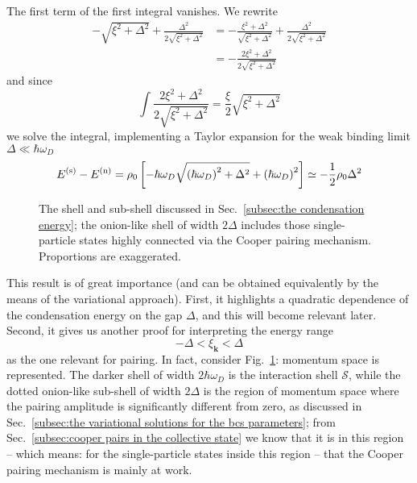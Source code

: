 The first term of the first integral vanishes. We rewrite
\[
\begin{aligned}
	- \sqrt{\xi^2 + \Delta^2} + \frac{\Delta^2}{2\sqrt{\xi^2 + \Delta^2}} &= - \frac{\xi^2 + \Delta^2}{\sqrt{\xi^2 + \Delta^2}} + \frac{\Delta^2}{2\sqrt{\xi^2 + \Delta^2}}\\
	&= - \frac{2\xi^2 + \Delta^2}{2\sqrt{\xi^2 + \Delta^2}}
\end{aligned}
\]
and since
\[
	\int \frac{2\xi^2 + \Delta^2}{2\sqrt{\xi^2 + \Delta^2}} = \frac{\xi}{2} \sqrt{\xi^2 + \Delta^2}
\]
we solve the integral, implementing a Taylor expansion for the weak binding limit $\Delta\ll\hbar\omega_D$
\[
	E^{(\mathrm{s})} - E^{(\mathrm{n})} = \rho_0 \left[{-\hbar\omega_D\sqrt{\left({\hbar\omega_D}\right)^2 + \Delta^2} + \left({\hbar\omega_D}\right)^2}\right] \simeq - \frac{1}{2} \rho_0 \Delta^2
\]

\begin{figure}
	\centering
	
	\caption{The shell and sub-shell discussed in Sec.~\ref{subsec:the condensation energy}; the onion-like shell of width $2\Delta$ includes those single-particle states highly connected via the Cooper pairing mechanism. Proportions are exaggerated.}
	\label{fig:condensation energy shell}
\end{figure}

This result is of great importance (and can be obtained equivalently by the means of the variational approach). First, it highlights a quadratic dependence of the condensation energy on the gap $\Delta$, and this will become relevant later. Second, it gives us another proof for interpreting the energy range
\[
	- \Delta < \xi_\mathbf{k} < \Delta
\]
as the one relevant for pairing. In fact, consider Fig.~\ref{fig:condensation energy shell}: momentum space is represented. The darker shell of width $2\hbar\omega_D$ is the interaction shell $\mathcal{S}$, while the dotted onion-like sub-shell of width $2\Delta$ is the region of momentum space where the pairing amplitude is significantly different from zero, as discussed in Sec.~\ref{subsec:the variational solutions for the bcs parameters}; from Sec.~\ref{subsec:cooper pairs in the collective state} we know that it is in this region -- which means: for the single-particle states inside this region -- that the Cooper pairing mechanism is mainly at work.

